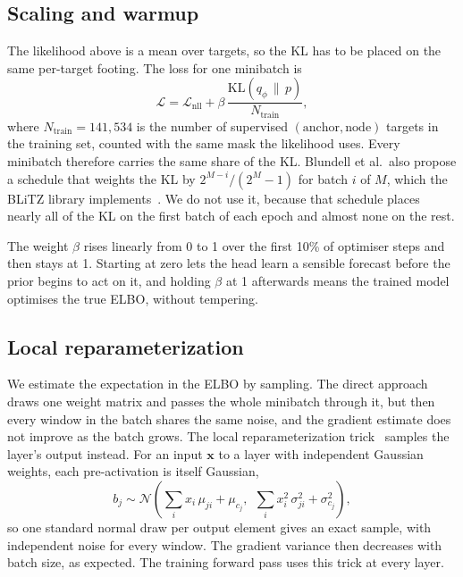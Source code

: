 \documentclass{article}
\begin{document}
\subsection{Scaling and warmup}
\label{sec:beta}

The likelihood above is a mean over targets, so the KL has to be placed on the
same per-target footing. The loss for one minibatch is
\begin{equation}
  \mathcal{L} = \mathcal{L}_{\mathrm{nll}} + \beta \, \frac{\mathrm{KL}(q_{\phi} \,\|\, p)}{N_{\mathrm{train}}},
\end{equation}
where $N_{\mathrm{train}} = 141{,}534$ is the number of supervised
$(\text{anchor}, \text{node})$ targets in the training set, counted with the
same mask the likelihood uses. Every minibatch therefore carries the same
share of the KL. Blundell et al.\ also propose a schedule that weights the KL
by $2^{M-i}/(2^{M}-1)$ for batch $i$ of $M$, which the BLiTZ library
implements~\citep{esposito2020blitz}. We do not use it, because that schedule
places nearly all of the KL on the first batch of each epoch and almost none
on the rest.

The weight $\beta$ rises linearly from 0 to 1 over the first 10\% of optimiser
steps and then stays at 1. Starting at zero lets the head learn a sensible
forecast before the prior begins to act on it, and holding $\beta$ at 1
afterwards means the trained model optimises the true ELBO, without tempering.

\subsection{Local reparameterization}
\label{sec:localrep}

We estimate the expectation in the ELBO by sampling. The direct approach draws
one weight matrix and passes the whole minibatch through it, but then every
window in the batch shares the same noise, and the gradient estimate does not
improve as the batch grows. The local reparameterization
trick~\citep{kingma2015variational} samples the layer's output instead. For an
input $\bm{x}$ to a layer with independent Gaussian weights, each
pre-activation is itself Gaussian,
\begin{equation}
  b_{j} \sim \mathcal{N}\!\left(\sum_{i} x_{i}\,\mu_{ji} + \mu_{c_j},\ \
    \sum_{i} x_{i}^{2}\,\sigma_{ji}^{2} + \sigma_{c_j}^{2}\right),
\end{equation}
so one standard normal draw per output element gives an exact sample, with
independent noise for every window. The gradient variance then decreases with
batch size, as expected. The training forward pass uses this trick at every
layer.
\end{document}
